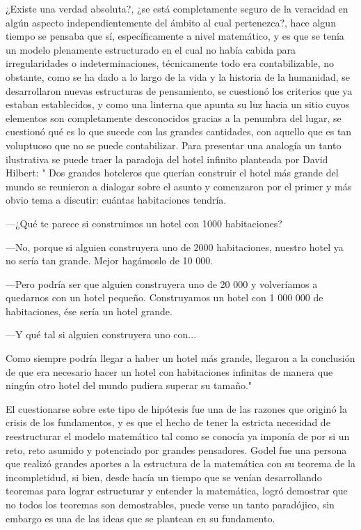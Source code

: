 \documentclass{article}
\begin{document}
¿Existe una verdad absoluta?, ¿se está completamente seguro de la veracidad en algún aspecto independientemente del ámbito al cual pertenezca?, hace algun tiempo se pensaba que sí, específicamente a nivel matemático, y es que se tenía un modelo plenamente estructurado en el cual no había cabida para irregularidades o indeterminaciones, técnicamente todo era contabilizable, no obstante, como se ha dado a lo largo de la vida y la historia de la humanidad, se desarrollaron nuevas estructuras de pensamiento, se cuestionó los criterios que ya estaban establecidos, y como una linterna que apunta su luz hacia un sitio cuyos elementos son completamente desconocidos gracias a la penumbra del lugar, se cuestionó qué es lo que sucede con las grandes cantidades, con aquello que es tan voluptuoso que no se puede contabilizar. Para presentar una analogía un tanto ilustrativa se puede traer la paradoja del hotel infinito planteada por David Hilbert: " Dos grandes hoteleros que querían construir el hotel más grande del mundo se reunieron a dialogar sobre el asunto y comenzaron por el primer y más obvio tema a discutir: cuántas habitaciones tendría.

—¿Qué te parece si construimos un hotel con 1000 habitaciones?

—No, porque si alguien construyera uno de 2000 habitaciones, nuestro hotel ya no sería tan grande. Mejor hagámoslo de 10 000.

—Pero podría ser que alguien construyera uno de 20 000 y volveríamos a quedarnos con un hotel pequeño. Construyamos un hotel con 1 000 000 de habitaciones, ése sería un hotel grande.

—Y qué tal si alguien construyera uno con...

Como siempre podría llegar a haber un hotel más grande, llegaron a la conclusión de que era necesario hacer un hotel con habitaciones infinitas de manera que ningún otro hotel del mundo pudiera superar su tamaño."

El cuestionarse sobre este tipo de hipótesis fue una de las razones que originó la crisis de los fundamentos, y es que el hecho de tener la estricta necesidad de reestructurar el modelo matemático tal como se conocía ya imponía de por si un reto, reto asumido y potenciado por grandes pensadores.
\newpage
Godel fue una persona que realizó grandes aportes a la estructura de la matemática con su teorema de la incompletidud, si bien, desde hacía un tiempo que se venían desarrollando teoremas para lograr estructurar y entender la matemática, logró demostrar que no todos los teoremas son demostrables, puede verse un tanto paradójico, sin embargo es una de las ideas que se plantean en su fundamento.
\end{document}
